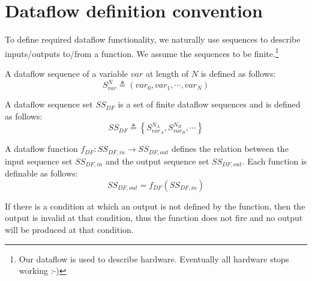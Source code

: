 \chapter{Dataflow definition convention}
To define required dataflow functionality, we naturally use sequences to describe inputs/outputs to/from a function. We assume the sequences to be finite.\footnote{Our dataflow is used to describe hardware. Eventually all hardware stops working :-)} 

\begin{definition}
	A dataflow sequence of a variable $var$ at length of $N$ is defined as follows:
	\begin{equation}
		S_{var}^{N}\triangleq \left( var_0,var_1,\cdots,var_N \right)
	\end{equation}
\end{definition}

\begin{definition}
	A dataflow sequence set $SS_{DF}$ is a set of finite dataflow sequences and is defined as follows:
	\begin{equation}
		SS_{DF}\triangleq \left\lbrace{S_{var_A}^{N_A}, S_{var_B}^{N_B},\cdots}\right\rbrace
	\end{equation}
\end{definition}

\begin{definition}
	A dataflow function $f_{DF}:SS_{DF,in}\rightarrow SS_{DF,out}$ defines the relation between the input sequence set $SS_{DF,in}$ and the output sequence set $SS_{DF,out}$. Each function is definable as follows:
	\begin{equation}
		SS_{DF,out}=f_{DF}\left(SS_{DF,in} \right) 
	\end{equation}
	\begin{remark}
		If there is a condition at which an output is not defined by the function, then the output is invalid at that condition, thus the function does not fire and no output will be produced at that condition.
	\end{remark}
\end{definition}

